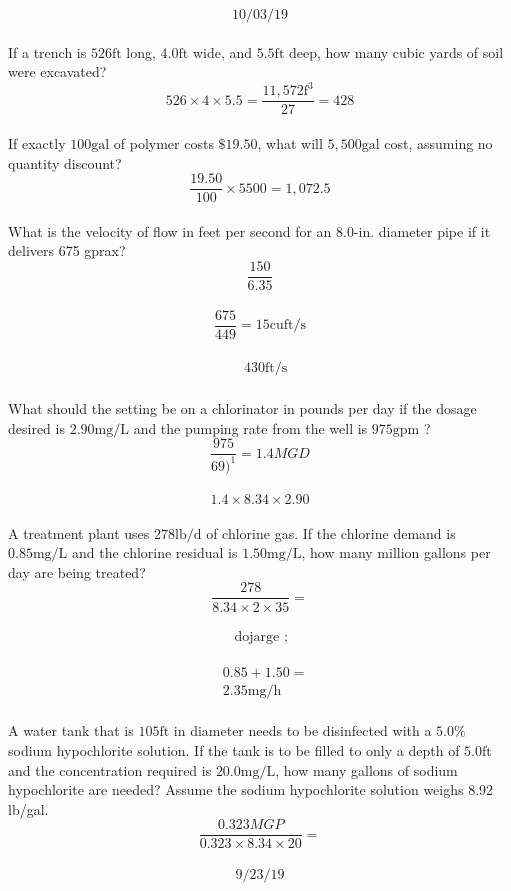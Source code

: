 $$10 / 03 / 19$$\\

If a trench is $526 \mathrm{ft}$ long, $4.0 \mathrm{ft}$ wide, and $5.5 \mathrm{ft}$ deep, how many cubic yards of soil were excavated?\\
$$526 \times 4 \times 5.5=\frac{11,572 \mathrm{f}^{3}}{27}=428$$\\

If exactly $100 \mathrm{gal}$ of polymer costs $\$ 19.50$, what will $5,500 \mathrm{gal}$ cost, assuming no quantity discount?\\
$$\frac{19.50}{100} \times 5500=1,072.5$$\\

What is the velocity of flow in feet per second for an 8.0-in. diameter pipe if it delivers 675 gprax?\\
$$\frac{150}{6.35}$$\\

$$\frac{675}{449}=15 \mathrm{cuft} / \mathrm{s}$$\\

$$\begin{aligned} & 430 \mathrm{ft} / \mathrm{s} \end{aligned}$$\\

What should the setting be on a chlorinator in pounds per day if the dosage desired is $2.90 \mathrm{mg} / \mathrm{L}$ and the pumping rate from the well is $975 \mathrm{gpm}$ ?\\
$$\frac{975}{69)^{1}}=1.4 MGD $$\\
$$1.4 \times 8.34 \times 2.90$$\\

A treatment plant uses $278 \mathrm{lb} / \mathrm{d}$ of chlorine gas. If the chlorine demand is $0.85 \mathrm{mg} / \mathrm{L}$ and the chlorine residual is $1.50 \mathrm{mg} / \mathrm{L}$, how many million gallons per day are being treated?\\
$$\frac{278}{8.34 \times 2 \times 35}=$$\\
$$\text { dojarge } ;$$\\
$$\begin{aligned}& 0.85+1.50= \\& 2.35 \mathrm{mg} / \mathrm{h}\end{aligned}$$\\

A water tank that is $105 \mathrm{ft}$ in diameter needs to be disinfected with a $5.0 \%$ sodium hypochlorite solution. If the tank is to be filled to only a depth of $5.0 \mathrm{ft}$ and the concentration required is $20.0 \mathrm{mg} / \mathrm{L}$, how many gallons of sodium hypochlorite are needed? Assume the sodium hypochlorite solution weighs 8.92 lb/gal.\\
$$\frac{0.323 M G P}{0.323 \times 8.34 \times 20}=$$\\
$$9 / 23 / 19$$\\

